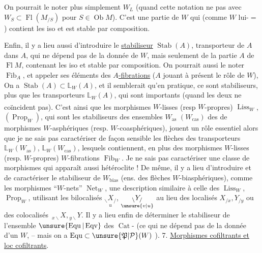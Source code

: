 On pourrait le noter plus simplement $W_L$
(quand cette notation ne  pas avec
$W_S\subset\operatorname{Fl}(M_{/S})$ pour $S\in\operatorname{Ob} M$). C'est une
partie de $W$ qui (comme $W$ lui-$=$)
contient les iso et est stable par composition.

Enfin, il y a lieu aussi d'introduire
le \uline{stabiliseur} $\operatorname{Stab}(A)$,  transporteur de
$A$ dans $A$, qui ne dépend pas de la donnée
de $W$, mais seulement de la partie $A$ de
$\operatorname{Fl} M$, contenant les iso et stable par composition.
 On pourrait aussi le noter $\operatorname{Fib}_A$, et
appeler ses éléments des \uline{$A$-fibrations} ($A$ jouant à
présent le rôle de $W$), 
On a $\operatorname{Stab}(A)\subset\mathbb L_W(A)$, et il semblerait qu'en
pratique, ce sont  stabiliseurs, plus que les
transporteurs $\mathbb L_W(A)$, qui sont importants (quand
les deux ne coïncident pas). C'est ainsi que
les morphismes $W$-lisses (resp\textsuperscript{} $W$-propres)
$\operatorname{Liss}_W$, $(\operatorname{Prop}_W)$, qui sont les stabiliseurs des
ensembles $W_{\mathrm{as}}$ $(W_{\mathrm{cas}})$ des  de morphismes
$W$-asphériques (resp. $W$-coasphériques),
jouent un rôle essentiel alors que je ne
sais pas caractériser de façon sensible les
flèches des transporteurs $\mathbb L_W(W_{\mathrm{as}})$, $\mathbb L_W(W_{\mathrm{cas}})$,
lesquels contiennent, en plus des morphismes
$W$-lisses (resp. $W$-propres)  $W$-fibrations
$\operatorname{Fib}_W$. Je ne sais pas  caractériser une
classe de morphismes qui apparaît aussi
hétéroclite ! De même, il y a lieu
d'introduire et de caractériser le
stabiliseur de $W_{\mathrm{bias}}$ (ens. des flèches
$W$-biasphériques), comme les morphismes
``$W$-nets'' $\operatorname{Net}_W$,  une description
similaire à celle des $\operatorname{Liss}_W$, $\operatorname{Prop}_W$,
utilisant les bilocalisés $\underset{u}{{}_{\backslash}X_{/}}$, $\underset{\unsure{v|u}}{{}_{\backslash}Y_{/}}$ au lieu
des localisés $X_{/x},Y_{/y}$ ou des colocalisés
$\,{}_{x\backslash}X,{}_{y\backslash}Y$. Il y a lieu enfin de déterminer
le stabiliseur de l'ensemble $\unsure{\operatorname{Equ}|\operatorname{Eqv}}$ des
$\operatorname{Cat}$- (ce qui ne dépend pas de la
donnée d'un $W$\unsure{)}, -- mais on a $\operatorname{Equ}\subset\unsure{\mathfrak{P}|\mathcal{P}}(W)$
).
7. \uline{Morphismes cofiltrants et loc cofiltrants}.

